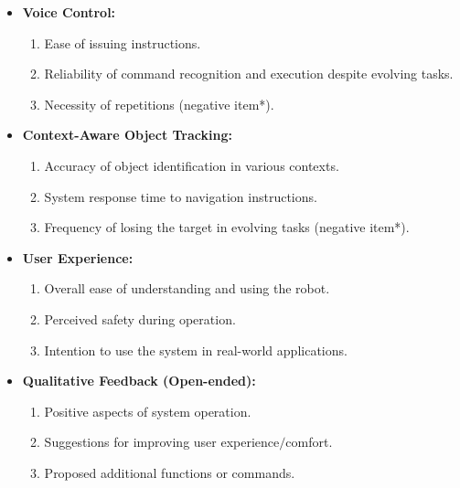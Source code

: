 \documentclass[lettersize,journal]{IEEEtran}
\begin{document}
\begin{itemize}[leftmargin=*]
	\item \textbf{Voice Control:} 
	\begin{enumerate}[label=Q\arabic*:, series=survey, widest=Q12, leftmargin=*]
		\item Ease of issuing instructions.
		\item Reliability of command recognition  and execution despite evolving tasks.
		\item Necessity of repetitions (negative item*). 
	\end{enumerate}
	
	\item \textbf{Context-Aware Object Tracking:} 
	\begin{enumerate}[label=Q\arabic*:, resume=survey, widest=Q12, leftmargin=*]
		\item Accuracy of object identification  in various contexts.
		\item System response time to navigation instructions. 
		\item Frequency of losing the target in evolving tasks (negative item*). 
	\end{enumerate}
	
	\item \textbf{User Experience:} 
	\begin{enumerate}[label=Q\arabic*:, resume=survey, widest=Q12, leftmargin=*]
		\item Overall ease of understanding and using the robot. 
		\item Perceived safety during operation. 
		\item Intention to use the system in real-world applications. 
	\end{enumerate}
	
	\item \textbf{Qualitative Feedback (Open-ended):} 
	\begin{enumerate}[label=Q\arabic*:, resume=survey, widest=Q12, leftmargin=*]
		\item Positive aspects of system operation. 
		\item Suggestions for improving user experience$\slash$comfort.
		\item Proposed additional functions or commands. 
	\end{enumerate}
\end{itemize}
\end{document}
